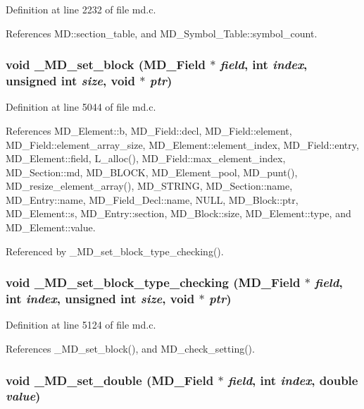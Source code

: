 Definition at line 2232 of file md.c.

References MD::section\_\-table, and MD\_\-Symbol\_\-Table::symbol\_\-count.
\subsubsection{\setlength{\rightskip}{0pt plus 5cm}void \_\-MD\_\-set\_\-block (\bf{MD\_\-Field} $\ast$ {\em field}, int {\em index}, unsigned int {\em size}, void $\ast$ {\em ptr})}\label{md_8c_b820bf467a714a58efebf2bc8daeab0c}




Definition at line 5044 of file md.c.

References MD\_\-Element::b, MD\_\-Field::decl, MD\_\-Field::element, MD\_\-Field::element\_\-array\_\-size, MD\_\-Element::element\_\-index, MD\_\-Field::entry, MD\_\-Element::field, L\_\-alloc(), MD\_\-Field::max\_\-element\_\-index, MD\_\-Section::md, MD\_\-BLOCK, MD\_\-Element\_\-pool, MD\_\-punt(), MD\_\-resize\_\-element\_\-array(), MD\_\-STRING, MD\_\-Section::name, MD\_\-Entry::name, MD\_\-Field\_\-Decl::name, NULL, MD\_\-Block::ptr, MD\_\-Element::s, MD\_\-Entry::section, MD\_\-Block::size, MD\_\-Element::type, and MD\_\-Element::value.

Referenced by \_\-MD\_\-set\_\-block\_\-type\_\-checking().
\subsubsection{\setlength{\rightskip}{0pt plus 5cm}void \_\-MD\_\-set\_\-block\_\-type\_\-checking (\bf{MD\_\-Field} $\ast$ {\em field}, int {\em index}, unsigned int {\em size}, void $\ast$ {\em ptr})}\label{md_8c_72fc988aad2171bf077dbd6fd5c46233}




Definition at line 5124 of file md.c.

References \_\-MD\_\-set\_\-block(), and MD\_\-check\_\-setting().
\subsubsection{\setlength{\rightskip}{0pt plus 5cm}void \_\-MD\_\-set\_\-double (\bf{MD\_\-Field} $\ast$ {\em field}, int {\em index}, double {\em value})}\label{md_8c_00ed6c7ae245360476f3bdff84af5e4a}




